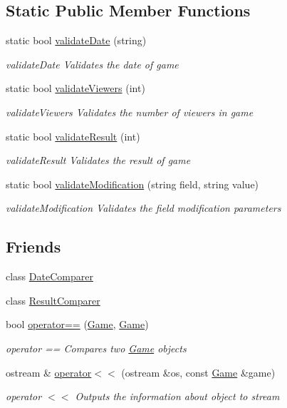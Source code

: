 \subsection*{Static Public Member Functions}
\begin{DoxyCompactItemize}
\item 
static bool \hyperlink{class_game_a2d5dd545601c7cfd7a44675430409cdf}{validate\-Date} (string)
\begin{DoxyCompactList}\small\item\em validate\-Date Validates the date of game \end{DoxyCompactList}\item 
static bool \hyperlink{class_game_ab82b7c4657c5db892f042e60ec4b0d8f}{validate\-Viewers} (int)
\begin{DoxyCompactList}\small\item\em validate\-Viewers Validates the number of viewers in game \end{DoxyCompactList}\item 
static bool \hyperlink{class_game_ae4d1cc3fbd6a409bc885f7b09632ffa1}{validate\-Result} (int)
\begin{DoxyCompactList}\small\item\em validate\-Result Validates the result of game \end{DoxyCompactList}\item 
static bool \hyperlink{class_game_ad31cce3106dc7e299328ffb4b9c2406c}{validate\-Modification} (string field, string value)
\begin{DoxyCompactList}\small\item\em validate\-Modification Validates the field modification parameters \end{DoxyCompactList}\end{DoxyCompactItemize}
\subsection*{Friends}
\begin{DoxyCompactItemize}
\item 
class \hyperlink{class_game_a3be5719b9c1a1526365bd01196cf2843}{Date\-Comparer}
\item 
class \hyperlink{class_game_ab9fc9ef738552f9c39ffa393c0e27b5c}{Result\-Comparer}
\item 
bool \hyperlink{class_game_a995e3a92879fd088c9e5c0f9cf5828d6}{operator==} (\hyperlink{class_game}{Game}, \hyperlink{class_game}{Game})
\begin{DoxyCompactList}\small\item\em operator == Compares two \hyperlink{class_game}{Game} objects \end{DoxyCompactList}\item 
ostream \& \hyperlink{class_game_a41c0344e76853337b335ed0cb6df12ec}{operator$<$$<$} (ostream \&os, const \hyperlink{class_game}{Game} \&game)
\begin{DoxyCompactList}\small\item\em operator $<$$<$ Outputs the information about object to stream \end{DoxyCompactList}\end{DoxyCompactItemize}


